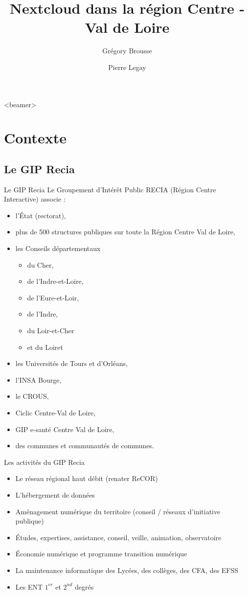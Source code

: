\documentclass[aspectratio=169]{beamer}
\title[]{Nextcloud dans la région Centre - Val de Loire}
\institute[]{Gip Recia}
\author{Grégory Brousse \and  Pierre Legay}
\newcommand{\absimage}[4][0.5,0.5]{%
	\begin{textblock}{#3}%
		[#1]%
		(#2)%
		\texttt{[image: \#4]}%
\end{textblock}}
\begin{document}
{
\frame{\titlepage \absimage{.10, .20}{.30}{GIP_RECIA.pdf}}
}


\begin{frame}<beamer>{} 
\tableofcontents
\end{frame}

\section{Contexte}
\subsection{Le GIP Recia}
 \begin{frame}{Le GIP Recia}
	Le Groupement d’Intérêt Public RECIA (Région Centre Interactive) associe : 
\begin{itemize}
\item l’État (rectorat),
\item plus de 500 structures publiques sur toute la Région Centre Val de Loire,
\item les Conseils départementaux 
	\begin{itemize}
		\item du Cher,
		\item de l’Indre-et-Loire,
		\item de l’Eure-et-Loir,
		\item de l'Indre, 
		\item du Loir-et-Cher 
		\item et du Loiret
	\end{itemize}
\item les Universités de Tours et d’Orléans,
\item l’INSA Bourge, 
\item le CROUS, 
\item Ciclic Centre-Val de Loire, 
\item GIP e-santé Centre Val de Loire, 
\item des communes et communautés de communes.
\end{itemize}
	
 \end{frame}
\begin{frame}{Les activités du GIP Recia }
\begin{itemize}
\item Le réseau régional haut débit (renater ReCOR)
\item L’hébergement de données
\item Aménagement numérique du territoire (conseil / réseaux d’initiative publique)
\item Études, expertises, assistance, conseil, veille, animation, observatoire
\item Économie numérique et programme transition numérique
\item La maintenance informatique des Lycées, des collèges, des CFA, des EFSS
\item Les ENT $1^{er}$ et $2^{nd}$ degrés
\end{itemize}
\end{frame}
\end{document}
